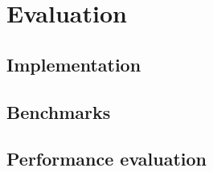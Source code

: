 \section{Evaluation}
\label{sec:evaluate}

\subsection{\CO}

\subsection{Implementation}


\subsection{Benchmarks}

\subsection{Performance evaluation}

